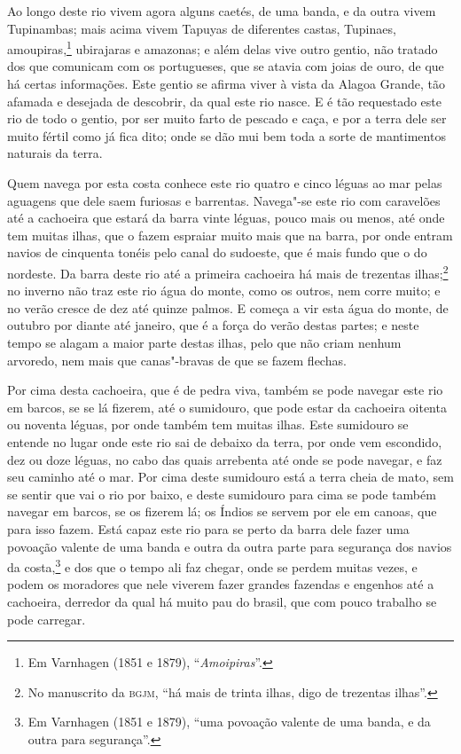 \begin{linenumbers}
Ao longo deste rio vivem agora alguns caetés, de uma banda, e da outra vivem Tupinambas;
mais acima vivem Tapuyas de diferentes castas, Tupinaes, amoupiras,\footnote{ Em Varnhagen
(1851 e 1879), ``\textit{Amoipiras}''.} ubirajaras e amazonas; e além delas vive outro
gentio, não tratado dos que comunicam com os portugueses, que se atavia com joias de ouro,
de que há certas informações. Este gentio se afirma viver à vista da Alagoa Grande, tão
afamada e desejada de descobrir, da qual este rio nasce. E é tão requestado este rio de
todo o gentio, por ser muito farto de pescado e caça, e por a terra dele ser muito fértil
como já fica dito; onde se dão mui bem toda a sorte de mantimentos naturais da terra.

Quem navega por esta costa conhece este rio quatro e cinco léguas ao mar pelas aguagens
que dele saem furiosas e barrentas. Navega"-se este rio com caravelões até a cachoeira que
estará da barra vinte léguas, pouco mais ou menos, até onde tem muitas ilhas, que o fazem
espraiar muito mais que na barra, por onde entram navios de cinquenta tonéis pelo canal do
sudoeste, que é mais fundo que o do nordeste. Da barra deste rio até a primeira cachoeira
há mais de trezentas ilhas;\footnote{ No manuscrito da \textsc{bgjm}, ``há mais de trinta
ilhas, digo de trezentas ilhas''.} no inverno não traz este rio água do monte, como os
outros, nem corre muito; e no verão cresce de dez até quinze palmos. E começa a vir esta
água do monte, de outubro por diante até janeiro, que é a força do verão destas partes; e
neste tempo se alagam a maior parte destas ilhas, pelo que não criam nenhum arvoredo, nem
mais que canas"-bravas de que se fazem flechas.

Por cima desta cachoeira, que é de pedra viva, também se pode navegar este rio em barcos,
se se lá fizerem, até o sumidouro, que pode estar da cachoeira oitenta ou noventa léguas,
por onde também tem muitas ilhas. Este sumidouro se entende no lugar onde este rio sai de
debaixo da terra, por onde vem escondido, dez ou doze léguas, no cabo das quais arrebenta
até onde se pode navegar, e faz seu caminho até o mar. Por cima deste sumidouro está a
terra cheia de mato, sem se sentir que vai o rio por baixo, e deste sumidouro para cima se
pode também navegar em barcos, se os fizerem lá; os Índios se servem por ele em canoas,
que para isso fazem. Está capaz este rio para se perto da barra dele fazer uma povoação
valente de uma banda e outra da outra parte para segurança dos navios da costa,\footnote{
Em Varnhagen (1851 e 1879), ``uma povoação valente de uma banda, e da outra para
segurança''.} e dos que o tempo ali faz chegar, onde se perdem muitas vezes, e podem os
moradores que nele viverem fazer grandes fazendas e engenhos até a cachoeira, derredor da
qual há muito pau do brasil, que com pouco trabalho se pode carregar.


\end{linenumbers}
